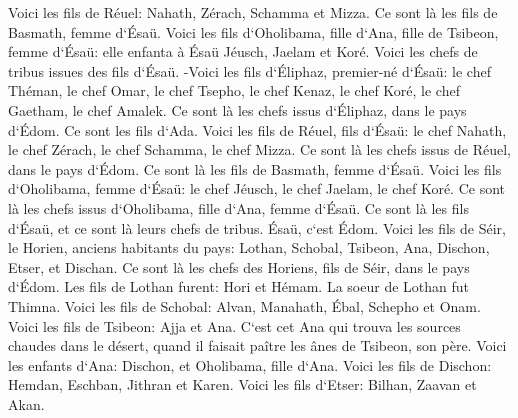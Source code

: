 \verse Voici les fils de Réuel: Nahath, Zérach, Schamma et Mizza. Ce sont là les fils de Basmath, femme d`Ésaü. 
\verse Voici les fils d`Oholibama, fille d`Ana, fille de Tsibeon, femme d`Ésaü: elle enfanta à Ésaü Jéusch, Jaelam et Koré. 
\verse Voici les chefs de tribus issues des fils d`Ésaü. -Voici les fils d`Éliphaz, premier-né d`Ésaü: le chef Théman, le chef Omar, le chef Tsepho, le chef Kenaz, 
\verse le chef Koré, le chef Gaetham, le chef Amalek. Ce sont là les chefs issus d`Éliphaz, dans le pays d`Édom. Ce sont les fils d`Ada. 
\verse Voici les fils de Réuel, fils d`Ésaü: le chef Nahath, le chef Zérach, le chef Schamma, le chef Mizza. Ce sont là les chefs issus de Réuel, dans le pays d`Édom. Ce sont là les fils de Basmath, femme d`Ésaü. 
\verse Voici les fils d`Oholibama, femme d`Ésaü: le chef Jéusch, le chef Jaelam, le chef Koré. Ce sont là les chefs issus d`Oholibama, fille d`Ana, femme d`Ésaü. 
\verse Ce sont là les fils d`Ésaü, et ce sont là leurs chefs de tribus. Ésaü, c`est Édom. 
\verse Voici les fils de Séir, le Horien, anciens habitants du pays: Lothan, Schobal, Tsibeon, Ana, 
\verse Dischon, Etser, et Dischan. Ce sont là les chefs des Horiens, fils de Séir, dans le pays d`Édom. 
\verse Les fils de Lothan furent: Hori et Hémam. La soeur de Lothan fut Thimna. 
\verse Voici les fils de Schobal: Alvan, Manahath, Ébal, Schepho et Onam. 
\verse Voici les fils de Tsibeon: Ajja et Ana. C`est cet Ana qui trouva les sources chaudes dans le désert, quand il faisait paître les ânes de Tsibeon, son père. 
\verse Voici les enfants d`Ana: Dischon, et Oholibama, fille d`Ana. 
\verse Voici les fils de Dischon: Hemdan, Eschban, Jithran et Karen. 
\verse Voici les fils d`Etser: Bilhan, Zaavan et Akan. 
